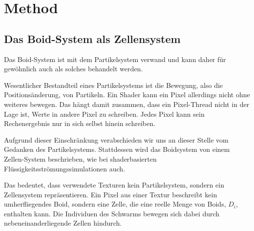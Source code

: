 \documentclass[a4paper, 10pt, journal]{wissarbIEEE}      %
\begin{document}



\section{Method}
\subsection{Das Boid-System als Zellensystem}
\label{sec_noParticelCells}

Das Boid-System ist mit dem Partikelsystem verwand \cite{Reynolds87flocks} und kann daher für gewöhnlich auch als solches behandelt werden.

 
Wesentlicher Bestandteil eines Partikelsystems ist die Bewegung, also die Positionsänderung, von Partikeln. 
Ein Shader kann ein Pixel allerdings nicht ohne weiteres bewegen. Das hängt damit zusammen, dass ein Pixel-Thread nicht in der Lage ist, Werte in andere Pixel zu schreiben. Jedes Pixel kann sein Rechenergebnis nur in sich selbst hinein schreiben.


Aufgrund dieser Einschränkung verabschieden wir uns an dieser Stelle vom Gedanken des Partikelsystems. Stattdessen wird das Boidsystem von einem Zellen-System beschrieben, wie bei shaderbasierten Flüssigkeitsströmungssimulationen \cite{GPUGems1} auch.

Das bedeutet, dass verwendete Texturen kein Partikelsystem, sondern ein Zellensystem repräsentieren. Ein Pixel aus einer Textur beschreibt kein umherfliegendes Boid, sondern eine Zelle, die eine reelle Menge von Boids, $D_i$, enthalten kann. Die Individuen des Schwarms bewegen sich dabei durch nebeneinanderliegende Zellen hindurch.
\end{document}
